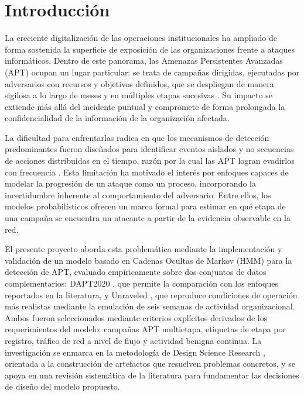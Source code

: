 \chapter{Introducción}

La creciente digitalización de las operaciones institucionales ha ampliado de forma sostenida la superficie de exposición de las organizaciones frente a ataques informáticos. Dentro de este panorama, las Amenazas Persistentes Avanzadas (APT) ocupan un lugar particular: se trata de campañas dirigidas, ejecutadas por adversarios con recursos y objetivos definidos, que se despliegan de manera sigilosa a lo largo de meses y en múltiples etapas sucesivas \parencite{hutchins2011killchain}. Su impacto se extiende más allá del incidente puntual y compromete de forma prolongada la confidencialidad de la información de la organización afectada.

La dificultad para enfrentarlas radica en que los mecanismos de detección predominantes fueron diseñados para identificar eventos aislados y no secuencias de acciones distribuidas en el tiempo, razón por la cual las APT logran evadirlos con frecuencia \parencite{alshamrani2019survey}. Esta limitación ha motivado el interés por enfoques capaces de modelar la progresión de un ataque como un proceso, incorporando la incertidumbre inherente al comportamiento del adversario. Entre ellos, los modelos probabilísticos ofrecen un marco formal para estimar en qué etapa de una campaña se encuentra un atacante a partir de la evidencia observable en la red.

El presente proyecto aborda esta problemática mediante la implementación y validación de un modelo basado en Cadenas Ocultas de Markov (HMM) para la detección de APT, evaluado empíricamente sobre dos conjuntos de datos complementarios: DAPT2020 \parencite{myneni2020dapt2020}, que permite la comparación con los enfoques reportados en la literatura, y Unraveled \parencite{myneni2023unraveled}, que reproduce condiciones de operación más realistas mediante la emulación de seis semanas de actividad organizacional. Ambos fueron seleccionados mediante criterios explícitos derivados de los requerimientos del modelo: campañas APT multietapa, etiquetas de etapa por registro, tráfico de red a nivel de flujo y actividad benigna continua. La investigación se enmarca en la metodología de Design Science Research \parencite{peffers2007dsrm}, orientada a la construcción de artefactos que resuelven problemas concretos, y se apoya en una revisión sistemática de la literatura para fundamentar las decisiones de diseño del modelo propuesto.

